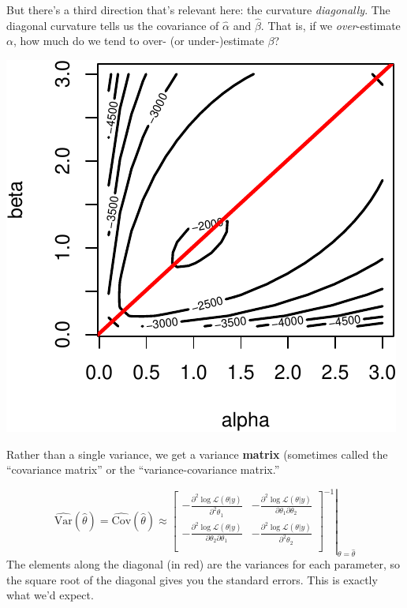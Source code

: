\documentclass[
]{book}
\begin{document}
But there's a third direction that's relevant here: the curvature
\emph{diagonally}. The diagonal curvature tells us the covariance of
\(\hat{\alpha}\) and \(\hat{\beta}\). That is, if we
\emph{over}-estimate \(\alpha\), how much do we tend to over- (or
under-)estimate \(\beta\)?

\includegraphics{04-02-wald-cis_files/figure-latex/unnamed-chunk-7-1.pdf}

Rather than a single variance, we get a variance \textbf{matrix}
(sometimes called the ``covariance matrix'' or the ``variance-covariance
matrix.''

\[
\begin{equation*}
\widehat{\text{Var}}(\hat{\theta})= \widehat{\text{Cov}}(\hat{\theta}) \approx \left. \left[ 
\displaystyle \begin{matrix}
- \frac{\partial^2 \log \mathcal{L}(\theta| y)}{\partial^2 \theta_1} & - \frac{\partial^2 \log \mathcal{L}(\theta| y)}{\partial \theta_1 \partial \theta_2}\\
- \frac{\partial^2 \log \mathcal{L}(\theta| y)}{\partial \theta_2 \partial \theta_1} & - \frac{\partial^2 \log \mathcal{L}(\theta| y)}{\partial^2 \theta_2}\\
\end{matrix}\right]^{-1} \right|_{\theta = \hat{\theta}}
\end{equation*}
\] The elements along the diagonal (in red) are the variances for each
parameter, so the square root of the diagonal gives you the standard
errors. This is exactly what we'd expect.
\end{document}
